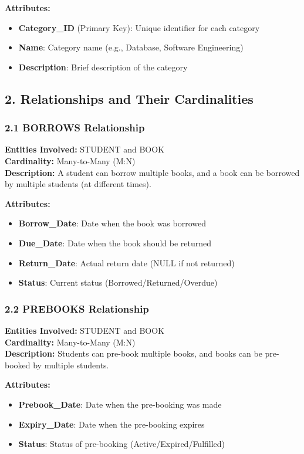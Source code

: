 \documentclass[12pt,a4paper]{article}
\begin{document}
\textbf{Attributes:}
\begin{itemize}
    \item \textbf{Category\_ID} (Primary Key): Unique identifier for each category
    \item \textbf{Name}: Category name (e.g., Database, Software Engineering)
    \item \textbf{Description}: Brief description of the category
\end{itemize}

\subsection{2. Relationships and Their Cardinalities}

\subsubsection{2.1 BORROWS Relationship}
\textbf{Entities Involved:} STUDENT and BOOK \\
\textbf{Cardinality:} Many-to-Many (M:N) \\
\textbf{Description:} A student can borrow multiple books, and a book can be borrowed by multiple students (at different times).

\textbf{Attributes:}
\begin{itemize}
    \item \textbf{Borrow\_Date}: Date when the book was borrowed
    \item \textbf{Due\_Date}: Date when the book should be returned
    \item \textbf{Return\_Date}: Actual return date (NULL if not returned)
    \item \textbf{Status}: Current status (Borrowed/Returned/Overdue)
\end{itemize}

\subsubsection{2.2 PREBOOKS Relationship}
\textbf{Entities Involved:} STUDENT and BOOK \\
\textbf{Cardinality:} Many-to-Many (M:N) \\
\textbf{Description:} Students can pre-book multiple books, and books can be pre-booked by multiple students.

\textbf{Attributes:}
\begin{itemize}
    \item \textbf{Prebook\_Date}: Date when the pre-booking was made
    \item \textbf{Expiry\_Date}: Date when the pre-booking expires
    \item \textbf{Status}: Status of pre-booking (Active/Expired/Fulfilled)
\end{itemize}
\end{document}

